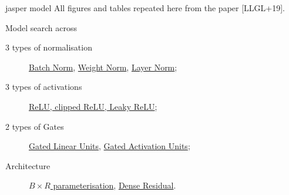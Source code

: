 \documentclass[aspectratio=169,xcolor={dvipsnames,svgnames}]{beamer}
\begin{document}
\begin{frame}[label={sec:jasper-model}]{jasper model}
All figures and tables repeated here from the paper
[LLGL+19].

Model search across
\begin{description}
\item[{3 types of normalisation}] \hyperlink{sec:batch-norm}{Batch Norm}, \hyperlink{sec:weight-norm}{Weight Norm},
\hyperlink{sec:layer-norm}{Layer Norm};
\item[{3 types of activations}] \hyperlink{sec:orgf33426f}{ReLU, clipped ReLU, Leaky
ReLU};
\item[{2 types of Gates}] \hyperlink{sec:gated-linear-unit}{Gated Linear Units}, \hyperlink{sec:gated-activation-unit}{Gated
Activation Units};
\item[{Architecture}] \hyperlink{sec:jasper-b-times-r-architecture}{\(B\times R\) parameterisation}, \hyperlink{sec:jasper-dense-residual-architecture}{Dense
Residual}.
\end{description}
\end{frame}
\end{document}
